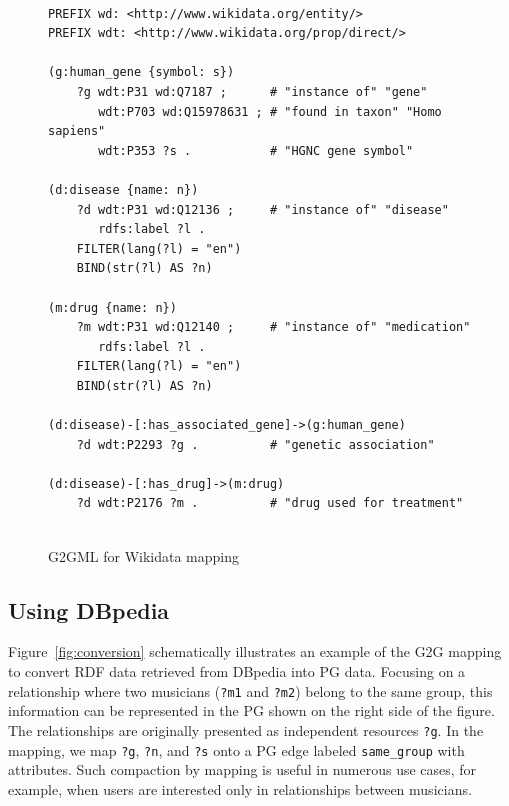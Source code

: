 \documentclass[runningheads]{llncs}
\begin{document}
\begin{figure}[!t]
\vspace{2mm}
\begin{scriptsize}
\begin{verbatim}
 
PREFIX wd: <http://www.wikidata.org/entity/>
PREFIX wdt: <http://www.wikidata.org/prop/direct/>
 
(g:human_gene {symbol: s})
    ?g wdt:P31 wd:Q7187 ;      # "instance of" "gene"
       wdt:P703 wd:Q15978631 ; # "found in taxon" "Homo sapiens"
       wdt:P353 ?s .           # "HGNC gene symbol"
 
(d:disease {name: n})
    ?d wdt:P31 wd:Q12136 ;     # "instance of" "disease"
       rdfs:label ?l .
    FILTER(lang(?l) = "en")
    BIND(str(?l) AS ?n)
 
(m:drug {name: n})
    ?m wdt:P31 wd:Q12140 ;     # "instance of" "medication"
       rdfs:label ?l .
    FILTER(lang(?l) = "en")
    BIND(str(?l) AS ?n)
 
(d:disease)-[:has_associated_gene]->(g:human_gene)
    ?d wdt:P2293 ?g .          # "genetic association"
 
(d:disease)-[:has_drug]->(m:drug)
    ?d wdt:P2176 ?m .          # "drug used for treatment"
 
\end{verbatim}
\end{scriptsize}
\caption{G2GML for Wikidata mapping}
\label{fig:g2gml_wikidata}
\end{figure}
 
\subsection{Using DBpedia}
 
Figure~\ref{fig:conversion} schematically illustrates an example of the G2G mapping to convert RDF data retrieved from DBpedia into PG data. 
Focusing on a relationship where two musicians (\texttt{?m1} and \texttt{?m2}) belong to the same group, this information can be represented in the PG shown on the right side of the figure. The relationships are originally presented as independent resources \texttt{?g}. In the mapping, we map \texttt{?g}, \texttt{?n}, and \texttt{?s} onto a PG edge labeled \texttt{same\_group} with attributes. Such compaction by mapping is useful in numerous use cases, for example, when users are interested only in relationships between musicians.
 
\end{document}

